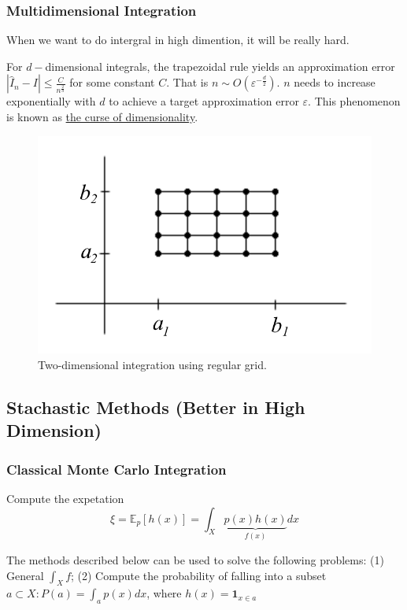 \documentclass[11pt,a4paper]{article}
\begin{document}
\subsubsection{Multidimensional Integration}
When we want to do intergral in high dimention, it will be really hard.

For $d-$dimensional integrals, the trapezoidal rule yields an approximation error $|\hat{I}_n-I|\leq \frac{C}{n^\frac{2}{d}}$ for some constant $C$. That is $n\sim O\left(\varepsilon^{-\frac{d}{2}}\right)$. $n$ needs to increase exponentially with $d$ to achieve a target approximation error $\varepsilon$. This phenomenon is known as \underline{the curse of dimensionality}.
\begin{center}\begin{figure}[htbp]
    \centering
    \includegraphics[scale=0.3]{two-dim int.png}
    \caption{Two-dimensional integration using regular grid.}
    \label{}
\end{figure}\end{center}



\subsection{Stachastic Methods (Better in High Dimension)}
\subsubsection{Classical Monte Carlo Integration}

Compute the expetation $$\xi=\mathbb{E}_p[h(x)]=\int_X \underbrace{p(x)h(x)}_{f(x)}dx$$

The methods described below can be used to solve the following problems: (1) General $\int_X f$; (2) Compute the probability of falling into a subset $a\subset X :P(a)=\int_a p(x)dx$, where $h(x)=\mathbf{1}_{x\in a}$
\end{document}
